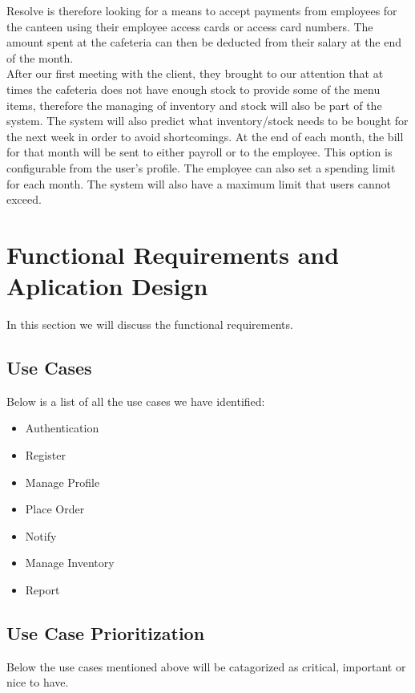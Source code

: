 \documentclass[a4paper,12pt]{article}
\begin{document}
Resolve is therefore looking for a means to accept payments from employees for the canteen using their employee access cards or access card numbers. The amount spent at the cafeteria can then be deducted from their salary at the end of the month.\\

After our first meeting with the client, they brought to our attention that at times the cafeteria does not have enough stock to provide some of the menu items, therefore the managing of inventory and stock will also be part of the system. The system will also predict what inventory/stock needs to be bought for the next week in order to avoid shortcomings. At the end of each month, the bill for that month will be sent to either payroll or to the employee. This option is configurable from the user's profile. The employee can also set a spending limit for each month. The system will also have a maximum limit that users cannot exceed.
 
\section{Functional Requirements and Aplication Design}
In this section we will discuss the functional requirements. \\

\subsection{Use Cases }
Below is a list of all the use cases we have identified:

\begin{itemize}

\item Authentication
\item Register
\item Manage Profile
\item Place Order
\item Notify
\item Manage Inventory
\item Report

\end{itemize}


\subsection{Use Case Prioritization}
Below the use cases mentioned above will be catagorized as critical, important or nice to have.
\end{document}

